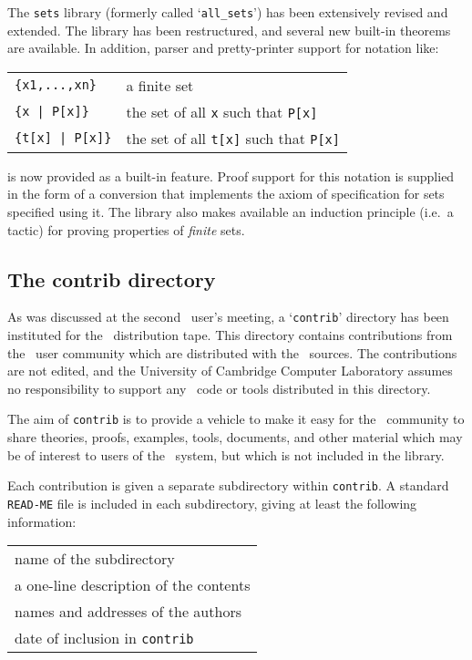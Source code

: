 The {\tt sets} library (formerly called `{\tt all\_sets}') has been
extensively revised and extended.  The library has been restructured, and
several new built-in theorems are available.  In addition, parser and
pretty-printer support for notation like:

\medskip
\hskip7mm{\begin{tabular}{@{}l@{\quad$=$\quad}l}
   \verb!{x1,...,xn}!    & a finite set\\
   \verb!{x | P[x]}!     & the set of all \verb!x! such that \verb!P[x]!\\
   \verb!{t[x] | P[x]}!  & the set of all \verb!t[x]! such that \verb!P[x]!
\end{tabular}}
\medskip

\noindent is now provided as a built-in feature. Proof support for this
notation is supplied in the form of a conversion that implements the axiom of
specification for sets specified using it.  The library also makes available
an induction principle (i.e.\ a tactic) for proving properties of {\it finite}
sets.

\subsection*{The contrib directory}

As was discussed at the second \HOL\ user's meeting, a `{\tt contrib}'
directory has been instituted for the \HOL\ distribution tape.  This directory
contains contributions from the \HOL\ user community which are distributed
with the \HOL\ sources.  The contributions are not edited, and the University
of Cambridge Computer Laboratory assumes no responsibility to support any
\HOL\ code or tools distributed in this directory.

The aim of {\tt contrib} is to provide a vehicle to make it easy for the \HOL\
community to share theories, proofs, examples, tools, documents, and other
material which may be of interest to users of the \HOL\ system, but which is
not included in the library.

Each contribution is given a separate subdirectory within {\tt contrib}. A
standard \verb!READ-ME! file is included in each subdirectory, giving at least
the following information: 

\medskip
\hskip7mm{\begin{tabular}{@{$\bullet\;\;$}l}
    name of the subdirectory\\
    a one-line description of the contents\\
    names and addresses of the authors \\
    date of inclusion in {\tt contrib}
\end{tabular}}
\medskip

